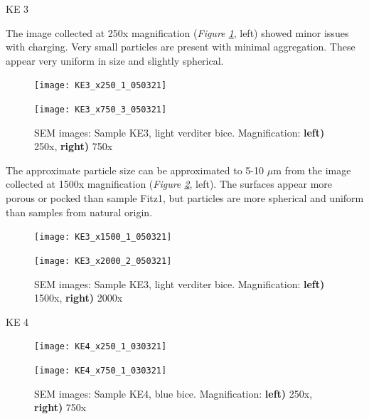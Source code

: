 KE 3

The image collected at 250x magnification (\textit{Figure \ref{fig:KE3_sem_1}}, left) showed minor issues with charging. Very small particles are present with minimal aggregation. These appear very uniform in size and slightly spherical. 

\begin{figure}[H]
\centering
\begin{minipage}{.45\textwidth}
  \centering
  \texttt{[image: KE3\_x250\_1\_050321]}
\end{minipage}
\begin{minipage}{.45\textwidth}
  \centering
  \texttt{[image: KE3\_x750\_3\_050321]}
\end{minipage}
\caption[SEM images: Sample KE3, light verditer bice]{SEM images: Sample KE3, light verditer bice. Magnification: \textbf{left)} 250x, \textbf{right)} 750x}
\label{fig:KE3_sem_1}
\end{figure}

The approximate particle size can be approximated to 5-10 $\mu$m from the image collected at 1500x magnification (\textit{Figure \ref{fig:KE3_sem_2}}, left). The surfaces appear more porous or pocked than sample Fitz1, but particles are more spherical and uniform than samples from natural origin. 

\begin{figure}[H]
\centering
\begin{minipage}{.45\textwidth}
  \centering
  \texttt{[image: KE3\_x1500\_1\_050321]}
\end{minipage}
\begin{minipage}{.45\textwidth}
  \centering
  \texttt{[image: KE3\_x2000\_2\_050321]}
\end{minipage}
\caption[SEM images: Sample KE3, light verditer bice]{SEM images: Sample KE3, light verditer bice. Magnification: \textbf{left)} 1500x, \textbf{right)} 2000x}
\label{fig:KE3_sem_2}
\end{figure}

KE 4

\begin{figure}[H]
\centering
\begin{minipage}{.45\textwidth}
  \centering
  \texttt{[image: KE4\_x250\_1\_030321]}
\end{minipage}
\begin{minipage}{.45\textwidth}
  \centering
  \texttt{[image: KE4\_x750\_1\_030321]}
\end{minipage}
\caption[SEM images: Sample KE4, blue bice]{SEM images: Sample KE4, blue bice. Magnification: \textbf{left)} 250x, \textbf{right)} 750x}
\label{fig:KE4_sem_1}
\end{figure}

